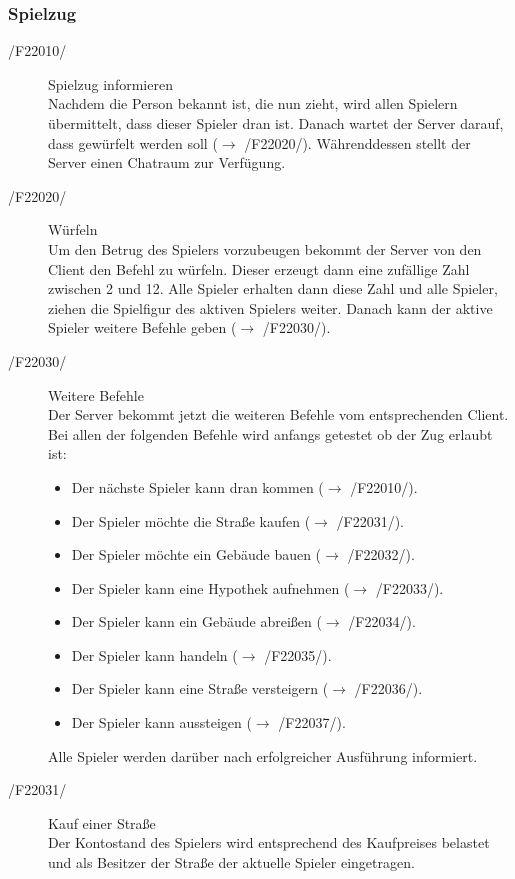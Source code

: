 \documentclass[a4paper,10pt]{article}
\begin{document}
\subsubsection{Spielzug}
\begin{description}
\item[/F22010/] Spielzug informieren \\
Nachdem die Person bekannt ist, die nun zieht, wird allen Spielern übermittelt, dass dieser Spieler dran ist. Danach wartet der Server darauf, dass gewürfelt werden soll ($\rightarrow$ /F22020/). Währenddessen stellt der Server einen Chatraum zur Verfügung.
\item[/F22020/] Würfeln \\
Um den Betrug des Spielers vorzubeugen bekommt der Server von den Client den Befehl zu würfeln. Dieser erzeugt dann eine zufällige Zahl zwischen 2 und 12. Alle Spieler erhalten dann diese Zahl und alle Spieler, ziehen die Spielfigur des aktiven Spielers weiter. Danach kann der aktive Spieler weitere Befehle geben ($\rightarrow$ /F22030/).
\item[/F22030/] Weitere Befehle \\
Der Server bekommt jetzt die weiteren Befehle vom entsprechenden Client. Bei allen der folgenden Befehle wird anfangs getestet ob der Zug erlaubt ist:
\begin{itemize}
\item Der nächste Spieler kann dran kommen ($\rightarrow$ /F22010/).
\item Der Spieler möchte die Straße kaufen ($\rightarrow$ /F22031/).
\item Der Spieler möchte ein Gebäude bauen ($\rightarrow$ /F22032/).
\item Der Spieler kann eine Hypothek aufnehmen ($\rightarrow$ /F22033/).
\item Der Spieler kann ein Gebäude abreißen ($\rightarrow$ /F22034/).
\item Der Spieler kann handeln ($\rightarrow$ /F22035/).
\item Der Spieler kann eine Straße versteigern ($\rightarrow$ /F22036/).
\item Der Spieler kann aussteigen ($\rightarrow$ /F22037/).
\end{itemize}
Alle Spieler werden darüber nach erfolgreicher Ausführung informiert.
\item[/F22031/] Kauf einer Straße \\
Der Kontostand des Spielers wird entsprechend des Kaufpreises belastet und als Besitzer der Straße der aktuelle Spieler eingetragen.

\end{description}
\end{document}
